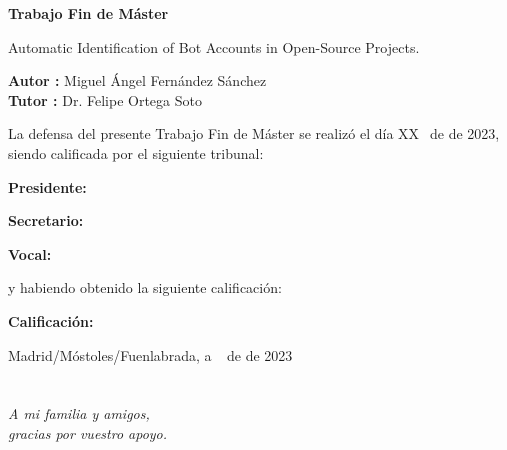 \documentclass[a4paper, 12pt]{book}
\begin{document}
\vspace{-4cm}
\begin{center}
\LARGE
\textbf{Trabajo Fin de Máster}

\vspace{1cm}
\large
Automatic Identification of Bot Accounts in Open-Source Projects.

\vspace{1cm}
\large
\textbf{Autor :} Miguel Ángel Fernández Sánchez \\
\textbf{Tutor :} Dr. Felipe Ortega Soto

\end{center}

\vspace{1cm}
La defensa del presente Trabajo Fin de Máster se realizó el día XX\qquad$\;\,$ de
\qquad\qquad\qquad\qquad \newline de 2023, siendo calificada por el siguiente tribunal:


\vspace{0.5cm}
\textbf{Presidente:}

\vspace{0.8cm}
\textbf{Secretario:}

\vspace{0.8cm}
\textbf{Vocal:}


\vspace{0.8cm}
y habiendo obtenido la siguiente calificación:

\vspace{0.8cm}
\textbf{Calificación:}


\vspace{0.8cm}
\begin{flushright}
Madrid/Móstoles/Fuenlabrada, a \qquad$\;\,$ de \qquad\qquad\qquad\qquad de 2023
\end{flushright}


\chapter*{}
\begin{flushright}
\textit{A mi familia y amigos, \\
gracias por vuestro apoyo.}
\end{flushright}

\vspace{2cm}
\end{document}
